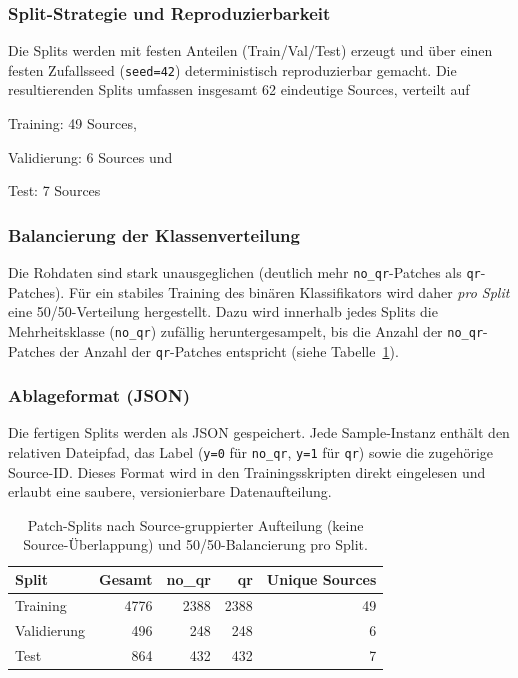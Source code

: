 \subsubsection{Split-Strategie und Reproduzierbarkeit}
Die Splits werden mit festen Anteilen (Train/Val/Test) erzeugt und über einen festen Zufallsseed (\texttt{seed=42}) deterministisch reproduzierbar gemacht. Die resultierenden Splits umfassen insgesamt 62 eindeutige Sources, verteilt auf 
\begin{listNorm}
    \item Training: 49 Sources,
    \item Validierung: 6 Sources und
    \item Test: 7 Sources
\end{listNorm}

\newpage

\subsubsection{Balancierung der Klassenverteilung}
Die Rohdaten sind stark unausgeglichen (deutlich mehr \texttt{no\_qr}-Patches als \texttt{qr}-Patches). Für ein stabiles Training des binären Klassifikators wird daher \emph{pro Split} eine 50/50-Verteilung hergestellt. Dazu wird innerhalb jedes Splits die Mehrheitsklasse (\texttt{no\_qr}) zufällig heruntergesampelt, bis die Anzahl der \texttt{no\_qr}-Patches der Anzahl der \texttt{qr}-Patches entspricht (siehe Tabelle~\ref{tab:patch_splits}). 

\subsubsection{Ablageformat (JSON)}
Die fertigen Splits werden als JSON gespeichert. Jede Sample-Instanz enthält den relativen Dateipfad, das Label (\texttt{y=0} für \texttt{no\_qr}, \texttt{y=1} für \texttt{qr}) sowie die zugehörige Source-ID. Dieses Format wird in den Trainingsskripten direkt eingelesen und erlaubt eine saubere, versionierbare Datenaufteilung. 

\begin{table}[htbp]
    \centering
    \caption{Patch-Splits nach Source-gruppierter Aufteilung (keine Source-Überlappung) und 50/50-Balancierung pro Split.}
    \begin{tabular}{lrrrr}
        \hline
        \textbf{Split} & \textbf{Gesamt} & \textbf{no\_qr} & \textbf{qr} & \textbf{Unique Sources} \\
        \hline
        Training     & 4776 & 2388 & 2388 & 49 \\
        Validierung  & 496  & 248  & 248  & 6  \\
        Test         & 864  & 432  & 432  & 7  \\
        \hline
    \end{tabular}
    \label{tab:patch_splits}
\end{table}

